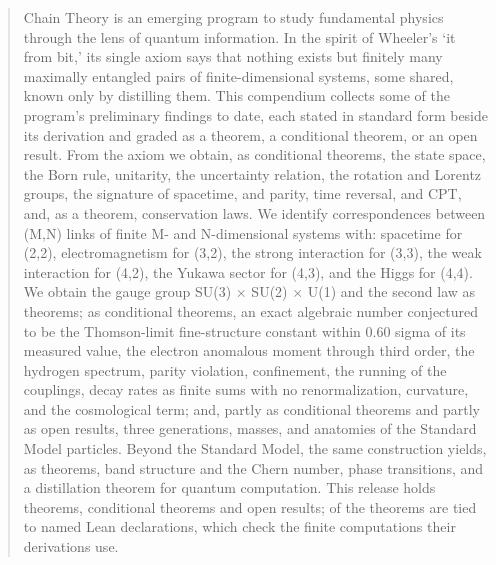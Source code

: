 \begin{abstract}\label{front:abstract}
Chain Theory is an emerging program to study fundamental physics through the lens of quantum information. In the spirit of Wheeler’s ‘it from bit,’ its single axiom says that nothing exists but finitely many maximally entangled pairs of finite-dimensional systems, some shared, known only by distilling them. This compendium collects some of the program’s preliminary findings to date, each stated in standard form beside its derivation and graded as a theorem, a conditional theorem, or an open result. From the axiom we obtain, as conditional theorems, the state space, the Born rule, unitarity, the uncertainty relation, the rotation and Lorentz groups, the signature of spacetime, and parity, time reversal, and CPT, and, as a theorem, conservation laws. We identify correspondences between (M,N) links of finite M- and N-dimensional systems with: spacetime for (2,2), electromagnetism for (3,2), the strong interaction for (3,3), the weak interaction for (4,2), the Yukawa sector for (4,3), and the Higgs for (4,4). We obtain the gauge group SU(3) × SU(2) × U(1) and the second law as theorems; as conditional theorems, an exact algebraic number conjectured to be the Thomson-limit fine-structure constant within 0.60 sigma of its measured value, the electron anomalous moment through third order, the hydrogen spectrum, parity violation, confinement, the running of the couplings, decay rates as finite sums with no renormalization, curvature, and the cosmological term; and, partly as conditional theorems and partly as open results, three generations, masses, and anatomies of the Standard Model particles. Beyond the Standard Model, the same construction yields, as theorems, band structure and the Chern number, phase transitions, and a distillation theorem for quantum computation. This release holds \atlasTheorems{} theorems, \atlasConditionals{} conditional theorems and \atlasOpen{} open results; \atlasTheoremsLean{} of the \atlasTheorems{} theorems are tied to named Lean declarations, which check the finite computations their derivations use.
\end{abstract}
